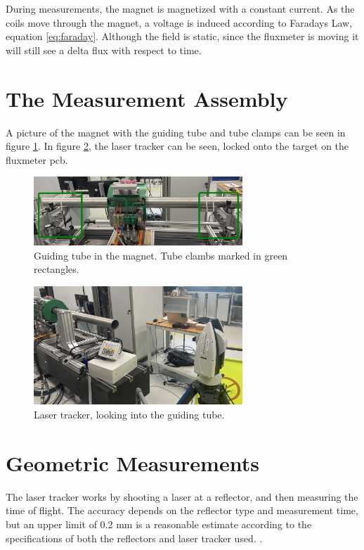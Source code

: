 During measurements, the magnet is magnetized with a constant current.
As the coils move through the magnet, a voltage is induced according
to Faradays Law, equation \ref{eq:faraday}. Although the field is
static, since the fluxmeter is moving it will still see a delta
flux with respect to time.

\section{The Measurement Assembly}
A picture of the magnet with the guiding tube and tube clamps can be seen in
figure \ref{fig:magnetassembly}. In figure \ref{fig:leica}, the laser tracker
can be seen, locked onto the target on the fluxmeter pcb.

\begin{figure}[!h]
    \centering
    \includegraphics[width=0.7\textwidth]{figs/magnet-assembly}
    \caption{Guiding tube in the magnet. Tube clambs marked in green rectangles.}
    \label{fig:magnetassembly}
\end{figure}

\begin{figure}[!h]
    \centering
    \includegraphics[width=0.7\textwidth]{figs/leica}
    \caption{Laser tracker, looking into the guiding tube.}
    \label{fig:leica}
\end{figure}

\section{Geometric Measurements}
The laser tracker works by shooting a laser at a reflector, and then
measuring the time of flight. The accuracy depends on the reflector
type and measurement time, but an upper limit of
0.2 mm is a reasonable estimate according to the
specifications of both the reflectors and laser tracker
used. \cite{noauthor_leica_2015}.

